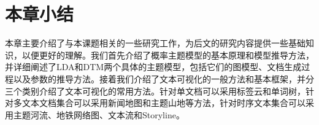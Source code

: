 \section{本章小结}
本章主要介绍了与本课题相关的一些研究工作，为后文的研究内容提供一些基础知识，以便更好的理解。我们首先介绍了概率主题模型的基本原理和模型推导方法，并详细阐述了LDA\cite{Blei:2003}和DTM\cite{Blei:2006}两个具体的主题模型，包括它们的图模型、文档生成过程以及参数的推导方法。接着我们介绍了文本可视化的一般方法和基本框架，并分三个类别介绍了文本可视化的常用方法。针对单文档可以采用标签云和单词树，针对多文本文档集合可以采用新闻地图和主题山地等方法，针对时序文本集合可以采用主题河流、地铁网络图、文本流和Storyline。




